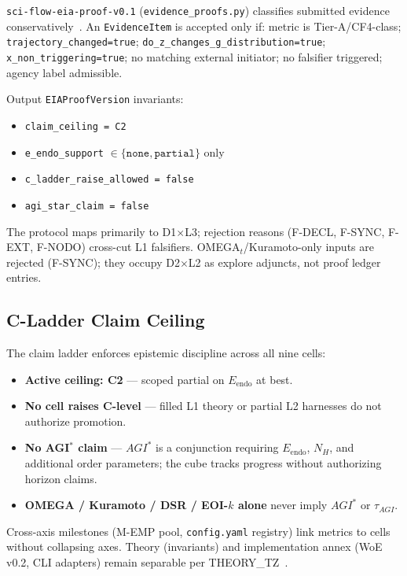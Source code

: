 \documentclass[11pt,a4paper]{article}
\theoremstyle{definition}
\begin{document}
\texttt{sci-flow-eia-proof-v0.1} (\texttt{evidence\_proofs.py}) classifies submitted evidence conservatively~\cite{kuznetsov2026proof}. An \texttt{EvidenceItem} is accepted only if: metric is Tier-A/CF4-class; \texttt{trajectory\_changed=true}; \texttt{do\_z\_changes\_g\_distribution=true}; \texttt{x\_non\_triggering=true}; no matching external initiator; no falsifier triggered; agency label admissible.

Output \texttt{EIAProofVersion} invariants:
\begin{itemize}[leftmargin=*]
\item \texttt{claim\_ceiling = C2}
\item \texttt{e\_endo\_support} $\in \{\texttt{none}, \texttt{partial}\}$ only
\item \texttt{c\_ladder\_raise\_allowed = false}
\item \texttt{agi\_star\_claim = false}
\end{itemize}

The protocol maps primarily to D1$\times$L3; rejection reasons (F-DECL, F-SYNC, F-EXT, F-NODO) cross-cut L1 falsifiers. OMEGA$_t$/Kuramoto-only inputs are rejected (F-SYNC); they occupy D2$\times$L2 as explore adjuncts, not proof ledger entries.

\subsection{C-Ladder Claim Ceiling}

The claim ladder enforces epistemic discipline across all nine cells:
\begin{itemize}[leftmargin=*]
\item \textbf{Active ceiling: C2} --- scoped partial on $E_{\mathrm{endo}}$ at best.
\item \textbf{No cell raises C-level} --- filled L1 theory or partial L2 harnesses do not authorize promotion.
\item \textbf{No AGI$^{*}$ claim} --- $AGI^{*}$ is a conjunction requiring $E_{\mathrm{endo}}$, $N_H$, and additional order parameters; the cube tracks progress without authorizing horizon claims.
\item \textbf{OMEGA / Kuramoto / DSR / EOI-$k$ alone} never imply $AGI^{*}$ or $\tau_{AGI}$.
\end{itemize}

Cross-axis milestones (M-EMP pool, \texttt{config.yaml} registry) link metrics to cells without collapsing axes. Theory (invariants) and implementation annex (WoE v0.2, CLI adapters) remain separable per THEORY\_TZ~\cite{kuznetsov2026theorytz}.
\end{document}
